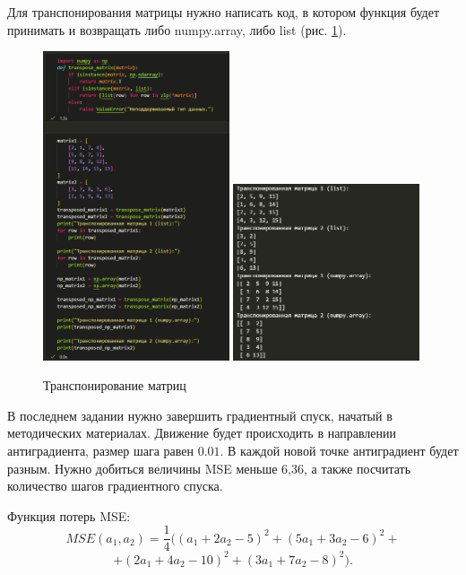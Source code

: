 \documentclass[14pt,a4paper]{extarticle}
\begin{document}
Для транспонирования матрицы нужно написать код, в котором
функция будет принимать и возвращать либо numpy.array, либо list (рис. \ref{pic:code}).
\begin{figure}[h!]
    \centering
    \includegraphics[width=0.49\textwidth]{figures/transp_code.png}
    \includegraphics[width=0.49\textwidth]{figures/transp_result.png}
    \caption{Транспонирование матриц}
    \label{pic:code}
\end{figure}

В последнем задании нужно завершить градиентный спуск,
начатый в методических материалах. Движение будет происходить в направлении антиградиента,
размер шага равен $0.01$. В каждой новой точке антиградиент будет разным. Нужно добиться величины MSE меньше 6,36,
а также посчитать количество шагов градиентного спуска.

Функция потерь MSE:
\[{MSE}(a_1, a_2) = \frac{1}{4} ((a_1 + 2a_2 - 5)^2 + (5a_1 + 3a_2 - 6)^2 +\]\[+ (2a_1 + 4a_2 - 10)^2 +(3a_1 + 7a_2 - 8)^2).\]
\end{document}
